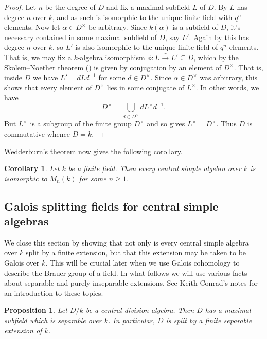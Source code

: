 \documentclass[11pt]{amsart}
\numberwithin{equation}{section}
\newtheorem{cor}[equation]{Corollary}
\newtheorem{proposition}[equation]{Proposition}
\theoremstyle{remark}
\theoremstyle{remark}
\theoremstyle{remark}
\theoremstyle{definition}
\theoremstyle{definition}
\theoremstyle{definition}
\theoremstyle{definition}
\theoremstyle{definition}
\theoremstyle{definition}
\begin{document}
\begin{proof}
Let $n$ be the degree of $D$ and fix a maximal subfield $L$ of $D$. By  $L$ has degree $n$ over $k$, and as such is isomorphic to the unique finite field with $q^n$ elements.  Now let $\alpha\in D^{\times}$ be arbitrary. Since $k(\alpha)$ is a subfield of $D$, it's necessary contained in some maximal subfield of $D$, say $L'$. Again by  this has degree $n$ over $k$, so $L'$ is also isomorphic to the unique finite field of $q^n$ elements. That is, we may fix a $k$-algebra isomorphism $\phi:L\stackrel{\sim}{\rightarrow}L'\subseteq D$, which by the Skolem--Noether theorem () is given by conjugation by an element of $D^\times$. That is, inside $D$ we have $L'=dLd^{-1}$ for some $d\in D^\times$. Since $\alpha\in D^{\times}$ was arbitrary, this shows that every element of $D^\times$ lies in some conjugate of $L^\times$. In other words, we have
\[D^\times=\bigcup_{d\in D^\times}dL^\times d^{-1}.\]
But $L^\times$ is a subgroup of the finite group $D^\times$ and so  gives $L^\times=D^\times$. Thus $D$ is commutative whence $D=k$.
\end{proof}

Wedderburn's theorem now gives the following corollary.

\begin{cor} \label{little wedderburn}
Let $k$ be a finite field. Then every central simple algebra over $k$ is isomorphic to $M_n(k)$ for some $n\geq 1$.
\end{cor}

\subsection{Galois splitting fields for central simple algebras}

We close this section by showing that not only is every central simple algebra over $k$ split by a finite extension, but that this extension may be taken to be Galois over $k$. This will be crucial later when we use Galois cohomology to describe the Brauer group of a field. In what follows we will use various facts about separable and purely inseparable extensions. See Keith Conrad's notes \cite{KC} for an introduction to these topics.

\begin{proposition} \label{separable max field}
Let $D/k$ be a central division algebra. Then $D$ has a maximal subfield which is separable over $k$. In particular, $D$ is split by a finite separable extension of $k$.
\end{proposition}
\end{document}
